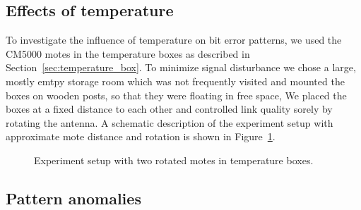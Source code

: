 

\subsection{Effects of temperature}
\label{subsec:effects_of_temperature}

To investigate the influence of temperature on bit error patterns, we used the CM5000 motes in the temperature boxes as described in Section~\ref{sec:temperature_box}.
To minimize signal disturbance we chose a large, mostly emtpy storage room which was not frequently visited and mounted the boxes on wooden posts, so that they were floating in free space, 
We placed the boxes at a fixed distance to each other and controlled link quality sorely by rotating the antenna.
A schematic description of the experiment setup with approximate mote distance and rotation is shown in Figure~\ref{fig:2mote_experiment_setup}.




\begin{figure}[H]
	\centering
	\caption{Experiment setup with two rotated motes in temperature boxes.}
	\label{fig:2mote_experiment_setup}
\end{figure}


\subsection{Pattern anomalies}
\label{subsec:pattern_anomalies}

